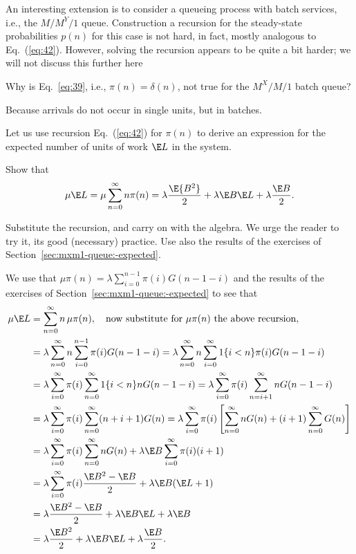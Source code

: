 An interesting extension is to consider a queueing process with batch
services, i.e., the $M/M^Y/1$ queue. Construction a recursion for the
steady-state probabilities $p(n)$ for this case is not hard, in fact,
mostly analogous to Eq.~(\ref{eq:42}).  However, solving the recursion
appears to be quite a bit harder; we will not discuss this further here

\begin{exercise}
  Why is Eq.~\eqref{eq:39}, i.e., $\pi(n)=\delta(n)$, not true for the
  $M^X/M/1$ batch queue?
\begin{solution}
 Because arrivals do not occur in single units, but in batches.
\end{solution}
\end{exercise}

Let us use  recursion Eq.~(\ref{eq:42}) for $\pi(n)$ to
 derive an expression for the expected number of units of work $\E L$
 in the system.
\begin{exercise}
 Show that
\begin{equation}\label{eq:67}
  \mu \E L =\mu \sum_{n=0}^\infty n \pi(n) = \lambda \frac{\E{B^2}}2  + \lambda \E B \E L +\lambda \frac{\E B}2.
\end{equation}
\begin{hint}
Substitute the
  recursion, and carry on with the algebra. We urge the reader to try
  it, its good (necessary) practice.  Use also the results of the
  exercises of Section~\ref{sec:mxm1-queue:-expected}.  
\end{hint}
\begin{solution}
  We use that $\mu \pi(n) =\lambda \sum_{i=0}^{n-1} \pi(i) G(n-1-i)$
  and the results of the exercises of
  Section~\ref{sec:mxm1-queue:-expected} to see that
\begin{align*}
  \mu \E L
  &=\sum_{n=0}^\infty n\, \mu \pi(n), \quad \text{now substitute for $\mu \pi(n)$ the above recursion}, \\
& =\lambda \sum_{n=0}^\infty n \sum_{i=0}^{n-1} \pi(i) G(n-1-i) 
  =\lambda \sum_{n=0}^\infty n \sum_{i=0}^\infty 1\{i<n\} \pi(i) G(n-1-i) \\
& =\lambda \sum_{i=0}^\infty \pi(i) \sum_{n=0}^\infty 1\{i<n\} n G(n-1-i) 
  =\lambda \sum_{i=0}^\infty \pi(i) \sum_{n=i+1}^\infty n G(n-1-i) \\
& =\lambda \sum_{i=0}^\infty \pi(i) \sum_{n=0}^\infty (n+i+1) G(n) 
  =\lambda \sum_{i=0}^\infty \pi(i) \left[\sum_{n=0}^\infty n G(n) +(i+1) \sum_{n=0}^\infty G(n)\right]  \\
  &=\lambda \sum_{i=0}^\infty \pi(i)\sum_{n=0}^\infty n G(n) +\lambda  \E B \sum_{i=0}^\infty \pi(i) (i+1)  \\ 
  &=\lambda \sum_{i=0}^\infty \pi(i) \frac{\E B^2 -\E B}2  + \lambda \E B (\E L +1)  \\ 
  &= \lambda \frac{\E B^2 -\E B}2  + \lambda \E B \E L +\lambda \E B \\
  &= \lambda \frac{\E B^2 }2  + \lambda \E B \E L +\lambda \frac{\E B}2.
\end{align*}
\end{solution}
\end{exercise}

